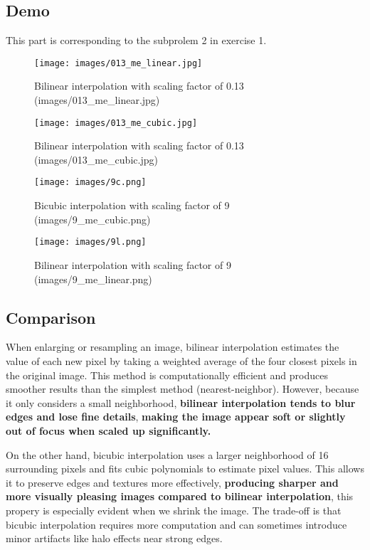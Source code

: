 \documentclass[12pt]{article}
\begin{document}
\subsection{Demo}
This part is corresponding to the subprolem 2 in exercise 1.
\begin{figure}[H]
    \centering
    \texttt{[image: images/013\_me\_linear.jpg]}
    \caption{Bilinear interpolation with scaling factor of 0.13 (images/013\_me\_linear.jpg)}
\end{figure}
\begin{figure}[H]
    \centering
    \texttt{[image: images/013\_me\_cubic.jpg]}
    \caption{Bilinear interpolation with scaling factor of 0.13 (images/013\_me\_cubic.jpg)}
\end{figure}
\begin{figure}[H]
    \centering
    \texttt{[image: images/9c.png]}
    \caption{Bicubic interpolation with scaling factor of 9 (images/9\_me\_cubic.png)}
\end{figure}
\begin{figure}[H]
    \centering
    \texttt{[image: images/9l.png]}
    \caption{Bilinear interpolation with scaling factor of 9 (images/9\_me\_linear.png)}
\end{figure}
\subsection{Comparison}
When enlarging or resampling an image, bilinear interpolation estimates the value of each new pixel by taking a weighted average of the four closest pixels in the original image. This method is computationally efficient and produces smoother results than the simplest method (nearest-neighbor). However, because it only considers a small neighborhood, \textbf{bilinear interpolation tends to blur edges and lose fine details}, \textbf{making the image appear soft or slightly out of focus when scaled up significantly.}

On the other hand, bicubic interpolation uses a larger neighborhood of 16 surrounding pixels and fits cubic polynomials to estimate pixel values. This allows it to preserve edges and textures more effectively, \textbf{producing sharper and more visually pleasing images compared to bilinear interpolation}, this propery is especially evident when we shrink the image. The trade-off is that bicubic interpolation requires more computation and can sometimes introduce minor artifacts like halo effects near strong edges.
\end{document}

